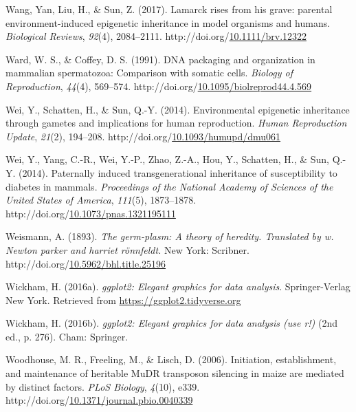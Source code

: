 \documentclass[12pt,twoside]{reedthesis}
\newlength{\cslhangindent}
\newenvironment{CSLReferences}[2] %
 {%
  \setlength{\parindent}{0pt}
  \ifodd #1 \everypar{\setlength{\hangindent}{\cslhangindent}}\ignorespaces\fi
  \ifnum #2 > 0
  \setlength{\parskip}{#2\baselineskip}
  \fi
 }%
 {}
\begin{document}
\begin{CSLReferences}{1}{0}
\leavevmode{}%
Wang, Yan, Liu, H., \& Sun, Z. (2017). Lamarck rises from his grave: parental environment-induced epigenetic inheritance in model organisms and humans. \emph{Biological Reviews}, \emph{92}(4), 2084--2111. http://doi.org/\href{https://doi.org/10.1111/brv.12322}{10.1111/brv.12322}

\leavevmode{}%
Ward, W. S., \& Coffey, D. S. (1991). DNA packaging and organization in mammalian spermatozoa: Comparison with somatic cells. \emph{Biology of Reproduction}, \emph{44}(4), 569--574. http://doi.org/\href{https://doi.org/10.1095/biolreprod44.4.569}{10.1095/biolreprod44.4.569}

\leavevmode{}%
Wei, Y., Schatten, H., \& Sun, Q.-Y. (2014). Environmental epigenetic inheritance through gametes and implications for human reproduction. \emph{Human Reproduction Update}, \emph{21}(2), 194--208. http://doi.org/\href{https://doi.org/10.1093/humupd/dmu061}{10.1093/humupd/dmu061}

\leavevmode{}%
Wei, Y., Yang, C.-R., Wei, Y.-P., Zhao, Z.-A., Hou, Y., Schatten, H., \& Sun, Q.-Y. (2014). Paternally induced transgenerational inheritance of susceptibility to diabetes in mammals. \emph{Proceedings of the National Academy of Sciences of the United States of America}, \emph{111}(5), 1873--1878. http://doi.org/\href{https://doi.org/10.1073/pnas.1321195111}{10.1073/pnas.1321195111}

\leavevmode{}%
Weismann, A. (1893). \emph{The germ-plasm: A theory of heredity. Translated by w. Newton parker and harriet rönnfeldt.} New York: Scribner. http://doi.org/\href{https://doi.org/10.5962/bhl.title.25196}{10.5962/bhl.title.25196}

\leavevmode{}%
Wickham, H. (2016a). \emph{ggplot2: Elegant graphics for data analysis}. Springer-Verlag New York. Retrieved from \url{https://ggplot2.tidyverse.org}

\leavevmode{}%
Wickham, H. (2016b). \emph{ggplot2: Elegant graphics for data analysis (use r!)} (2nd ed., p. 276). Cham: Springer.

\leavevmode{}%
Woodhouse, M. R., Freeling, M., \& Lisch, D. (2006). Initiation, establishment, and maintenance of heritable MuDR transposon silencing in maize are mediated by distinct factors. \emph{PLoS Biology}, \emph{4}(10), e339. http://doi.org/\href{https://doi.org/10.1371/journal.pbio.0040339}{10.1371/journal.pbio.0040339}


\end{CSLReferences}
\end{document}

